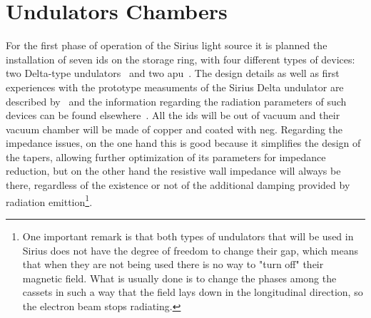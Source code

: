 \section{Undulators Chambers}

    For the first phase of operation of the Sirius light source it is planned the installation of seven \gls{ids} on the storage ring, with four different types of devices: two Delta-type undulators~\cite{Temnykh2008} and two \gls{apu}~\cite{Carr1991}. The design details as well as first experiences with the prototype measuments of the Sirius Delta undulator are described by~ and the information regarding the radiation parameters of such devices can be found elsewhere~\cite{Sirius2013}. All the \gls{ids} will be out of vacuum and their vacuum chamber will be made of copper and coated with \gls{neg}. Regarding the impedance issues, on the one hand this is good because it simplifies the design of the tapers, allowing further optimization of its parameters for impedance reduction, but on the other hand the resistive wall impedance will always be there, regardless of the existence or not of the additional damping provided by radiation emittion\footnote{One important remark is that both types of undulators that will be used in Sirius does not have the degree of freedom to change their gap, which means that when they are not being used there is no way to "turn off" their magnetic field. What is usually done is to change the phases among the~ cassets in such a way that the field lays down in the longitudinal direction, so the electron beam stops radiating.}.

